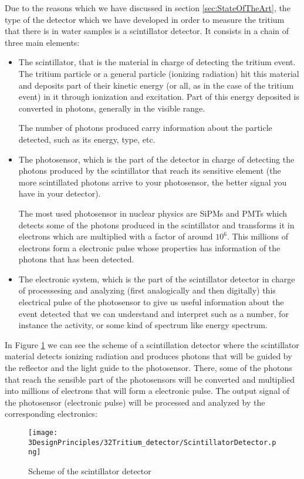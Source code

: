 Due to the reasons which we have discussed in section \ref{sec:StateOfTheArt}, the type of the detector which we have developed in order to measure the tritium that there is in water samples is a scintillator detector. It consists in a chain of three main elements:

\begin{itemize}

\item{} The scintillator, that is the material in charge of detecting the tritium event. The tritium particle or a general particle (ionizing radiation) hit this material and deposits part of their kinetic energy (or all, as in the case of the tritium event) in it through ionization and excitation. Part of this energy deposited is converted in photons, generally in the visible range.

The number of photons produced carry information about the particle detected, such as its energy, type, etc.

\item{} The photosensor, which is the part of the detector in charge of detecting the photons produced by the scintillator that reach its sensitive element (the more scintillated photons arrive to your photosensor, the better signal you have in your detector). 

The most used photosensor in nuclear physics are SiPMs and PMTs which detects some of the photons produced in the scintillator and transforms it in electrons which are multiplied with a factor of around $10^6$. This millions of electrons form a electronic pulse whose properties has information of the photons that has been detected.

\item{} The electronic system, which is the part of the scintillator detector in charge of processesing and analyzing (first analogically and then digitally) this electrical pulse of the photosensor to give us useful information about the event detected that we can understand and interpret such as a number, for instance the activity, or some kind of spectrum like energy spectrum.

\end{itemize}

In Figure \ref{fig:ScintillatorDetector} we can see the scheme of a scintillation detector where the scintillator material detects ionizing radiation and produces photons that will be guided by the reflector and the light guide to the photosensor. There, some of the photons that reach the sensible part of the photosensors will be converted and multiplied into millions of electrons that will form a electronic pulse. The output signal of the photosensor (electronic pulse) will be processed and analyzed by the corresponding electronics:

\begin{figure}[hbtp]
\texttt{[image: 3DesignPrinciples/32Tritium\_detector/ScintillatorDetector.png]}
\centering
\caption{Scheme of the scintillator detector \cite{CentelleadoresEspanyol}\label{fig:ScintillatorDetector}}
\end{figure}

